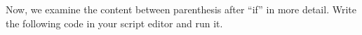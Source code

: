 Now, we examine the content between 
parenthesis after ``if'' in more detail. 
Write the following code in your script editor and run it.